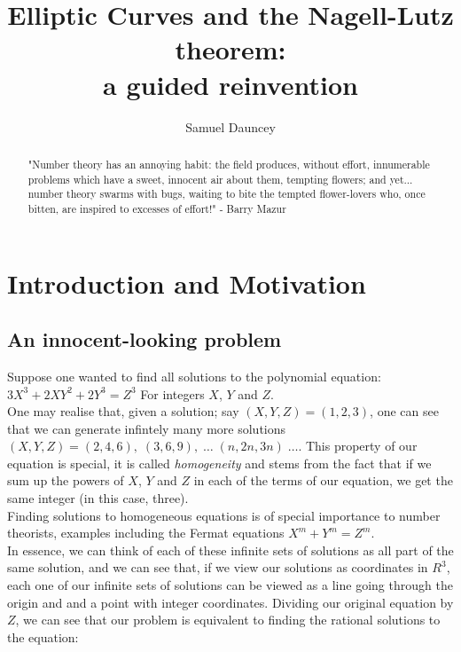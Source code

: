 \documentclass{article}
\title{Elliptic Curves and the Nagell-Lutz theorem:\\a guided reinvention}
\author{Samuel Dauncey}
\begin{document}
\maketitle

\begin{abstract}
    
"Number theory has an annoying habit: the field produces, without effort, innumerable problems which have a sweet, innocent air about them, tempting flowers; and yet... number theory swarms with bugs, waiting to bite the tempted flower-lovers who, once bitten, are inspired to excesses of effort!" - Barry Mazur
\end{abstract}

\section{Introduction and Motivation}

\subsection{An innocent-looking problem}

Suppose one wanted to find all solutions to the polynomial equation:\\

$3 X^3 +  2 X Y^2 + 2 Y^3 = Z^3$ \quad For integers $X$, $Y$ and $Z$. \\

 One may realise that, given a solution; say $(X, Y, Z) = (1, 2, 3)$, one can see that we can generate infintely many more solutions $(X, Y, Z) = (2, 4, 6), \; (3, 6, 9), \; \dots \; (n, 2n, 3n) \; \dots $. This property of our equation is special, it is called \emph{homogeneity} and stems from the fact that if we sum up the powers of $X$, $Y$ and $Z$ in each of the terms of our equation, we get the same integer (in this case, three). \\
 
 Finding solutions to homogeneous equations is of special importance to number theorists, examples including the Fermat equations $X^m + Y^m = Z^m$. \\
 
 In essence, we can think of each of these infinite sets of solutions as all part of the same solution, and we can see that, if we view our solutions as coordinates in $R^3$, each one of our infinite sets of solutions can be viewed as a line going through the origin and and a point with integer coordinates. Dividing our original equation by $Z$, we can see that our problem is equivalent to finding the rational solutions to the equation:\\
 
\end{document}
